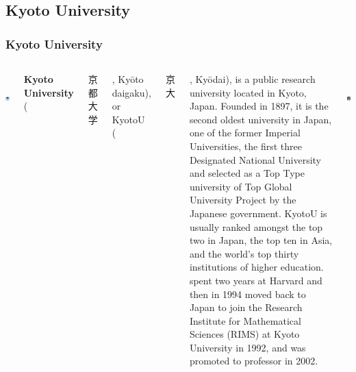 \documentclass[9pt]{beamer}
\begin{document}
        \subsection{Kyoto University}
        \begin{frame}
            \frametitle{Kyoto University}
            \begin{columns}
                    \begin{centering}
                        \includegraphics[width=2cm,height=2cm]{images/uni.png}\\
                        \vspace{0.2cm}
                    \end{centering}
                    \justify
                    \textbf{Kyoto University} (\begin{CJK}{UTF8}{min}京都大学\end{CJK}, Kyōto daigaku), or KyotoU (\begin{CJK}{UTF8}{min}京大\end{CJK}, Kyōdai), is a public research university located in Kyoto, Japan. Founded in 1897, it is the second oldest university in Japan, one of the former Imperial Universities, the first three Designated National University and selected as a Top Type university of Top Global University Project by the Japanese government.
                    \justify
                    KyotoU is usually ranked amongst the top two in Japan, the top ten in Asia, and the world's top thirty institutions of higher education.\\\vspace{0.3cm}
                    \pause
                    \hyperlink{mochizuki}{} spent two years at Harvard and then in 1994 moved back to Japan to join the Research Institute for Mathematical Sciences (RIMS) at Kyoto University in 1992, and was promoted to professor in 2002.\\\vspace{0.3cm}
                    \begin{centering}
                        \includegraphics[width=1.8cm,height=2cm]{images/photo.jpg}\\

\end{centering}
\end{columns}
\end{frame}
\end{document}
